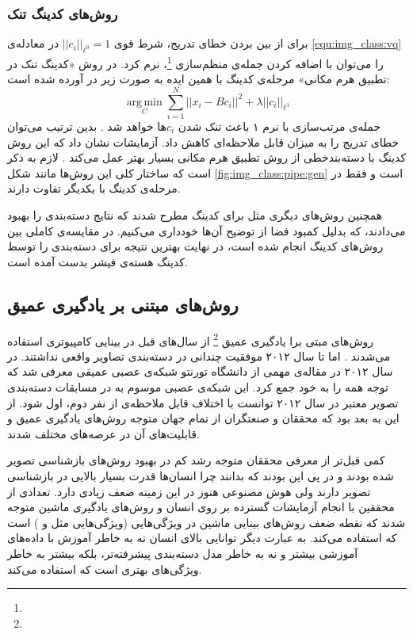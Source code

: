 \documentclass[11pt]{article}
\begin{document}
\subsubsection{روش‌های کدینگ تنک}
برای از بین بردن خطای تدریج، شرط قوی
$|| c_i ||_{\ell^0} = 1$
در معادله‌ی
\ref{equ:img_class:vq}
را می‌توان با اضافه کردن جمله‌ی منظم‌سازی
\footnote{}،
نرم کرد. در روش «کدینگ تنک در تطبیق هرم مکانی»
\cite{scspm}
مرحله‌ی کدینگ با همین ایده به صورت زیر در آورده شده است:
\begin{equation}
	\operatorname*{arg\,min}_C \sum_{i=1}^{N} || x_i - B c_i ||^2  + \lambda || c_i ||_{\ell ^ 1}
	\label{equ:img_class:sc}
\end{equation}
جمله‌ی مرتب‌سازی با نرم ۱ باعث تنک شدن $c_i$ها خواهد شد
\cite{sc}.
بدین ترتیب می‌توان خطای تدریج را به میزان قابل ملاحظه‌ای کاهش داد. آزمایشات نشان داد که این روش کدینگ با دسته‌بندخطی از روش تطبیق هرم مکانی بسیار بهتر عمل می‌کند
\cite{scspm}.
لازم به ذکر است که ساختار کلی این روش‌ها مانند شکل
\ref{fig:img_class:pipe:gen}
است و فقط در مرحله‌ی کدینگ با یکدیگر تفاوت دارند.

همچنین روش‌های دیگری مثل
\cite{llc, fisher_kernel, fisher_kernel_im}
برای کدینگ مطرح شدند که نتایج دسته‌بندی را بهبود می‌دادند، که بدلیل کمبود فضا از توضیح آن‌ها خودداری می‌کنیم. در
\cite{devil_coding}
مقایسه‌ی کاملی بین روش‌های کدینگ انجام شده است، در نهایت بهترین نتیجه برای دسته‌بندی را توسط کدینگ هسته‌ی فیشر
\cite{fisher_kernel_im}
بدست آمده است.
\subsection{روش‌های مبتنی بر یادگیری عمیق}\label{sec:img_class:dl}
روش‌های مبتی برا یادگیری عمیق
\footnote{}
از سال‌های قبل در بینایی کامپیوتری استفاده می‌شدند
\cite{lenet}.
اما تا سال ۲۰۱۲ موفقیت چندانی در دسته‌بندی تصاویر واقعی نداشتند. در سال ۲۰۱۲ در مقاله‌ی مهمی از دانشگاه تورنتو
\cite{alexnet}
شبکه‌ی عصبی عمیقی معرفی شد که توجه همه را به خود جمع کرد. این شبکه‌ی عصبی موسوم به
در مسابقات دسته‌بندی تصویر معتبر
\cite{ilsvrc}
در سال ۲۰۱۲ توانست با اختلاف قابل ملاحظه‌ی از نفر دوم، اول شود. از این به بعد بود که محققان و صنعتگران از تمام جهان متوجه روش‌های یادگیری عمیق و قابلیت‌های آن در عرصه‌های مختلف شدند.

کمی قبل‌تر از معرفی
محققان متوجه رشد کم در بهبود روش‌های بازشناسی تصویر شده بودند و در پی این بودند که بدانند چرا انسان‌ها قدرت بسیار بالایی در بازشناسی تصویر دارند ولی هوش‌ مصنوعی هنوز در این زمینه ضعف زیادی دارد. تعدادی از محققین با انجام آزمایشات گسترده بر روی انسان و روش‌های یادگیری ماشین متوجه شدند
\cite{parikh2010}
که نقطه ضعف روش‌های بینایی ماشین در ویژگی‌هایی (ویژگی‌هایی مثل
 \cite{sift} و  \cite{hog})
است که استفاده می‌کند. به عبارت دیگر توانایی بالای انسان نه به خاطر آموزش با داده‌های آموزشی بیشتر و نه به خاطر مدل دسته‌بندی پیشرفته‌تر، بلکه بیشتر به خاطر ویژگی‌های بهتری است که استفاده می‌کند.
\end{document}
